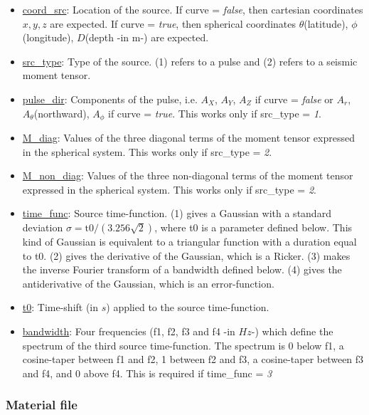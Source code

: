 \begin{itemize}[itemsep=10pt]
\item\underline{coord\_src}: Location of the source. If curve = \textit{false}, then cartesian coordinates
$x,y,z$ are expected. If curve = \textit{true}, then spherical coordinates $\theta$(latitude),
$\phi$(longitude), $D$(depth -in m-) are expected.

\item\underline{src\_type}: Type of the source. (1) refers to a pulse and (2) refers to a seismic moment tensor.

\item\underline{pulse\_dir}: Components of the pulse, i.e. $A_X$, $A_Y$, $A_Z$ if curve = \textit{false} or
$A_r$, $A_\theta$(northward), $A_\phi$ if curve = \textit{true}. This works only if src\_type = \textit{1}.

\item\underline{M\_diag}: Values of the three diagonal terms of the moment tensor expressed in the spherical
system. This works only if src\_type = \textit{2}.

\item\underline{M\_non\_diag}: Values of the three non-diagonal terms of the moment tensor expressed in the
spherical system. This works only if src\_type = \textit{2}.

\item\underline{time\_func}: Source time-function. (1) gives a Gaussian with a standard deviation
$\sigma = \mbox{t0}/(3.256\sqrt{2})$, where t0 is a parameter defined below. This kind of Gaussian is
equivalent to a triangular function with a duration equal to t0. (2) gives the derivative of the Gaussian,
which is a Ricker. (3) makes the inverse Fourier transform of a bandwidth defined below. (4) gives
the antiderivative of the Gaussian, which is an error-function.

\item\underline{t0}: Time-shift (in $s$) applied to the source time-function.

\item\underline{bandwidth}: Four frequencies (f1, f2, f3 and f4 -in $Hz$-) which define the spectrum of the
third source time-function. The spectrum is 0 below f1, a cosine-taper between f1 and f2, 1 between f2 and f3,
a cosine-taper between f3 and f4, and 0 above f4. This is required if time\_func = \textit{3}

\end{itemize}


\subsubsection{Material file}
\label{elasticfile}

